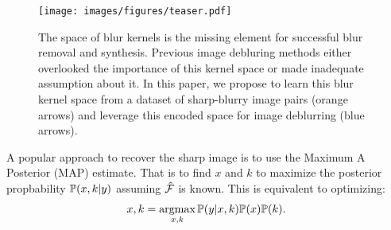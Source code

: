 \documentclass[final]{cvpr}
\begin{document}
\begin{figure}[t]
    \centering
    \texttt{[image: images/figures/teaser.pdf]}
    \caption{The space of blur kernels is the missing element for successful blur removal and synthesis. Previous image debluring methods either overlooked the importance of this kernel space or made inadequate assumption about it. In this paper, we propose to learn this blur kernel space from a dataset of sharp-blurry image pairs (orange arrows) and leverage this encoded space for image deblurring (blue arrows).}
    \label{fig:generalidea}
\end{figure}

A popular approach to recover the sharp image is to use the  Maximum A Posterior (MAP) estimate. That is to find $x$ and $k$ to maximize the posterior propbability $\mathbb{P}(x, k|y)$ assuming $\hat{\mathcal{F}}$ is known. This is equivalent to optimizing:  
\begin{align}
        x, k = \mathop{\textrm{argmax}}_{x, k} \mathbb{P}(y|x, k) \mathbb{P}(x) \mathbb{P}(k). \label{eq:map}
\end{align}
\end{document}
